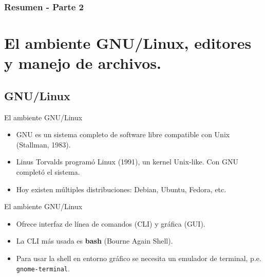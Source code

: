 \documentclass[10pt]{beamer}
\begin{document}
\myfront{}

\begin{frame}
  \titlepage
\end{frame}

\begin{frame}
  \frametitle{Resumen - Parte 2}
  \tableofcontents
\end{frame}



\section{El ambiente GNU/Linux, editores y manejo de archivos.} 

\subsection{GNU/Linux} 

\begin{frame}{El ambiente GNU/Linux}
\begin{itemize}
	\item GNU es un sistema completo de software libre compatible con Unix (Stallman, 1983).
	\item Linus Torvalds programó Linux (1991), un kernel Unix-like. Con GNU completó el sistema.
	\item Hoy existen múltiples distribuciones: Debian, Ubuntu, Fedora, etc.
\end{itemize}
\end{frame}

\begin{frame}{El ambiente GNU/Linux}
\begin{itemize}
	\item Ofrece interfaz de línea de comandos (CLI) y gráfica (GUI).
	\item La CLI más usada es \textbf{bash} (Bourne Again Shell).
	\item Para usar la shell en entorno gráfico se necesita un emulador de terminal, p.e. \texttt{gnome-terminal}.
\end{itemize}
\end{frame}
\end{document}
